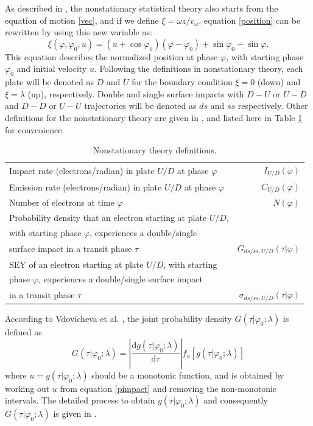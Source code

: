 \documentclass[a4paper,11pt]{article}
\begin{document}
As described in \cite{NS}, the nonstationary statistical theory also starts from the equation of motion \eqref{vec}, and if we define $\xi=\omega z/v_{\omega}$, equation \eqref{position} can be rewritten by using this new variable as:
\begin{equation}
\xi(\varphi,\varphi_0,u) = (u+\cos \varphi_0)(\varphi-\varphi_0)+\sin \varphi_0 - \sin \varphi.\label{nposition}
\end{equation}
This equation describes the normalized position at phase $\varphi$, with starting phase $\varphi_0$ and initial velocity $u$. Following the definitions in nonstationary theory, each plate will be denoted as $D$ and $U$ for the boundary condition $\xi=0$ (down) and $\xi=\lambda$ (up), respectively. Double and single surface impacts with $D-U$ or $U-D$ and $D-D$ or $U-U$ trajectories will be denoted as $ds$ and $ss$ respectively. Other definitions for the nonstationary theory are given in \cite{NS}, and listed here in Table \ref{my_table} for convenience.
\begin{table}[h]\footnotesize
{\renewcommand{\arraystretch}{1.5}
\renewcommand{\tabcolsep}{0.2cm}}
\caption{Nonstationary theory definitions.}
\centering
  \label{my_table}
  \begin{tabular}{ l  r  }
    \hline
\hline			
    Impact rate (electrons/radian) in plate $U/D$ at phase $\varphi$ & $I_{U/D}(\varphi)$ \\
    Emission rate (electrons/radian) in plate $U/D$ at phase $\varphi$ & $C_{U/D}(\varphi)$ \\
    Number of electrons at time $\varphi$ & $N(\varphi)$ \\
    Probability density that an electron starting at plate $U/D$,\\
    with starting phase $\varphi$, experiences a double/single\\
    surface impact in a transit phase $\tau$ & $G_{ds/ss,U/D}(\tau|\varphi)$\\
    SEY of an electron starting at plate $U/D$, with starting\\
    phase $\varphi$, experiences a double/single surface impact\\
    in a transit phase $\tau$ & $\sigma_{ds/ss,U/D}(\tau|\varphi)$\\

    \hline 
 \hline
  \end{tabular}
 \end{table}

According to Vdovicheva et al. \cite{ST}, the joint probability density $G(\tau|\varphi_0;\lambda)$ is defined as
\begin{equation}
G(\tau|\varphi_0;\lambda)=\left| \frac{\mathrm{d}g(\tau|\varphi_0;\lambda)}{\mathrm{d}\tau} \right| f_u[g(\tau|\varphi_0;\lambda)] \label{gdsdef}
\end{equation}
where $u=g(\tau|\varphi_0;\lambda)$ should be a monotonic function, and is  obtained by working out $u$ from equation \eqref{pimpact} and removing the non-monotonic intervals. The detailed process to obtain $g(\tau|\varphi_0;\lambda)$ and consequently $G(\tau|\varphi_0;\lambda)$ is given in \cite{ST}.
\end{document}
